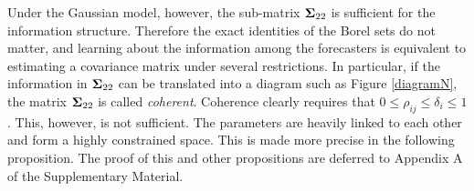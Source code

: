 \documentclass[12pt]{article}
\theoremstyle{definition}
\newtheorem{example}[theorem]{Example}
\theoremstyle{definition}
\begin{document}
Under the Gaussian model, however, the sub-matrix ${\bf \Sigma}_{22}$ is sufficient for the information structure. Therefore the exact identities of the Borel sets do not matter, and learning about the
information among the forecasters is equivalent to estimating a
covariance matrix under several restrictions.  In particular, if the
information in ${\bf\Sigma}_{22}$ can be translated into a diagram
such as Figure \ref{diagramN},
the matrix ${\bf\Sigma}_{22}$ is called \textit{coherent}.  Coherence
clearly requires that $0 \leq \rho_{ij} \leq \delta_i \leq 1$.  This, however, is not sufficient. The parameters are heavily linked to each other and form a highly constrained space. 
%
This is made more precise in the following proposition. 
 The proof of this and other propositions are deferred to Appendix A of the Supplementary Material.
\end{document}
